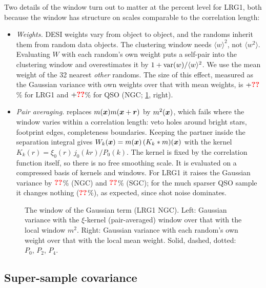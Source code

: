 Two details of the window turn out to matter at the percent level for LRG1, both because the window has structure on scales comparable to the correlation length:
\begin{itemize}
\item \emph{Weights.} DESI weights vary from object to object, and the randoms inherit them from random data objects. The clustering window needs $\langle w\rangle^2$, not $\langle w^2\rangle$. Evaluating $W$ with each random's own weight puts a self-pair into the clustering window and overestimates it by $1+{\rm var}(w)/\langle w\rangle^2$. We use the mean weight of the 32 nearest \emph{other} randoms. The size of this effect, measured as the Gaussian variance with own weights over that with mean weights, is $+\val{ownweight/LRG1/NGC}$\% for LRG1 and $+\val{ownweight/QSO/NGC}$\% for QSO (NGC; \cref{fig:window}, right).
\item \emph{Pair averaging.}  replaces $m(\boldsymbol{x})m(\boldsymbol{x}+\boldsymbol{r})$ by $m^2(\boldsymbol{x})$, which fails where the window varies within a correlation length: veto holes around bright stars, footprint edges, completeness boundaries. Keeping the partner inside the separation integral gives $W_k(\boldsymbol{x})=m(\boldsymbol{x})\,(K_k*m)(\boldsymbol{x})$ with the kernel $K_k(r)=\xi_0(r)\,j_0(kr)/P_0(k)$. The kernel is fixed by the correlation function itself, so there is no free smoothing scale. It is evaluated on a compressed basis of kernels and windows. For LRG1 it raises the Gaussian variance by $\val{kernelgain/LRG1/NGC}$\% (NGC) and $\val{kernelgain/LRG1/SGC}$\% (SGC); for the much sparser QSO sample it changes nothing ($\val{kernelgain/QSO/NGC}$\%), as expected, since shot noise dominates.
\end{itemize}

\begin{figure}
  \centering{}
  \caption{The window of the Gaussian term (LRG1 NGC). Left: Gaussian variance with the $\xi$-kernel (pair-averaged) window over that with the local window $m^2$. Right: Gaussian variance with each random's own weight over that with the local mean weight. Solid, dashed, dotted: $P_0$, $P_2$, $P_4$.}
  \label{fig:window}
\end{figure}

\subsection{Super-sample covariance}

